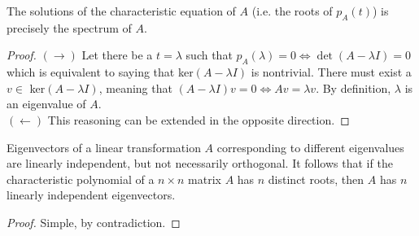   \begin{proposition}
  The solutions of the characteristic equation of $A$ (i.e. the roots of $p_A (t)$) is precisely the spectrum of $A$. 
  \end{proposition}

  \begin{proof} $(\rightarrow)$ Let there be a $t = \lambda$ such that $p_A (\lambda) = 0 \iff \det{(A - \lambda I)} = 0$ which is equivalent to saying that ker$(A - \lambda I)$ is nontrivial. There must exist a $v \in $ ker$(A - \lambda I)$, meaning that $(A - \lambda I) v = 0 \iff A v = \lambda v$. By definition, $\lambda$ is an eigenvalue of $A$. \\
  $(\leftarrow)$ This reasoning can be extended in the opposite direction. 
  \end{proof}

  \begin{theorem}
  Eigenvectors of a linear transformation $A$ corresponding to different eigenvalues are linearly independent, but not necessarily orthogonal. It follows that if the characteristic polynomial of a $n \times n$ matrix $A$ has $n$ distinct roots, then $A$ has $n$ linearly independent eigenvectors. 
  \end{theorem}

  \begin{proof}
  Simple, by contradiction.
  \end{proof}

